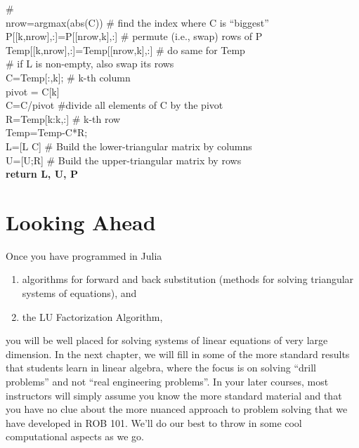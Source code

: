 \begin{tcolorbox}[sharp corners, colback=green!30, colframe=green!80!blue, title=\textbf{\Large LU Factorization of Matrices}]
\begin{algorithm}[H]
{{    \# \\
   nrow=argmax(abs(C)) \# find the index where C is ``biggest'' \\
   P[[k,nrow],:]=P[[nrow,k],:] \# permute (i.e., swap) rows of P  \\
  {\rm Temp}[[k,nrow],:]={\rm Temp}[[nrow,k],:] \# do same for {\rm Temp}\\
   \# if L is non-empty, also swap its rows \\
    {}
    C=Temp[:,k]; \# k-th column\\
    pivot = C[k]\\
    C=C/pivot \#divide all elements of C by the pivot \\
    R={\rm Temp}[k:k,:] \# k-th row\\
     {\rm Temp}={\rm Temp}-C*R; \\
     L=[L C]  \# Build the lower-triangular matrix by columns\\
    U=[U;R] \# Build the upper-triangular matrix by rows \\
  }
}
\textbf{return L, U, P}
\end{algorithm}
\end{tcolorbox}
   
\newpage

\section{Looking Ahead}

Once you have programmed in Julia 
\begin{enumerate}
\renewcommand{\labelenumi}{(\alph{enumi})}
\setlength{\itemsep}{.2cm}
    \item  algorithms for forward and back substitution (methods for solving triangular systems of equations), and 
    \item  the LU Factorization Algorithm, 
\end{enumerate}
you will be well placed for solving systems of linear equations of very large dimension. In the next chapter, we will fill in some of the more standard results that students learn in linear algebra, where the focus is on solving ``drill problems'' and not ``real engineering problems''.  In your later courses, most instructors will simply assume you know the more standard material and that you have no clue about the more nuanced approach to problem solving that we have developed in ROB 101. We'll do our best to throw in some cool computational aspects as we go.\\

